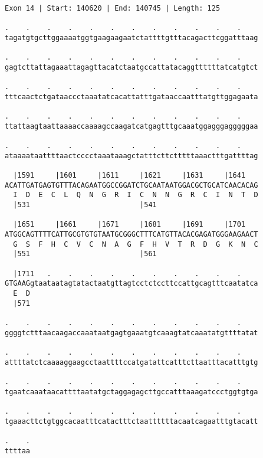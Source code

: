\documentclass{article}
\begin{document}
\begin{Verbatim}
Exon 14 | Start: 140620 | End: 140745 | Length: 125
 
.    .    .    .    .    .    .    .    .    .    .    .    
tagatgtgcttggaaaatggtgaagaagaatctattttgtttacagacttcggatttaag
  
.    .    .    .    .    .    .    .    .    .    .    .    
gagtcttattagaaattagagttacatctaatgccattatacaggttttttatcatgtct
  
.    .    .    .    .    .    .    .    .    .    .    .    
tttcaactctgataaccctaaatatcacattatttgataaccaatttatgttggagaata
  
.    .    .    .    .    .    .    .    .    .    .    .    
ttattaagtaattaaaaccaaaagccaagatcatgagtttgcaaatggagggagggggaa
  
.    .    .    .    .    .    .    .    .    .    .    .    
ataaaataattttaactcccctaaataaagctatttcttctttttaaactttgattttag
  
  |1591     |1601     |1611     |1621     |1631     |1641   
ACATTGATGAGTGTTTACAGAATGGCCGGATCTGCAATAATGGACGCTGCATCAACACAG
  I  D  E  C  L  Q  N  G  R  I  C  N  N  G  R  C  I  N  T  D
  |531                          |541                        
  
  |1651     |1661     |1671     |1681     |1691     |1701   
ATGGCAGTTTTCATTGCGTGTGTAATGCGGGCTTTCATGTTACACGAGATGGGAAGAACT
  G  S  F  H  C  V  C  N  A  G  F  H  V  T  R  D  G  K  N  C
  |551                          |561                        
  
  |1711   .    .    .    .    .    .    .    .    .    .    
GTGAAGgtaataatagtatactaatgttagtcctctccttccattgcagtttcaatatca
  E  D                                                      
  |571                                                      
  
.    .    .    .    .    .    .    .    .    .    .    .    
ggggtctttaacaagaccaaataatgagtgaaatgtcaaagtatcaaatatgttttatat
  
.    .    .    .    .    .    .    .    .    .    .    .    
attttatctcaaaaggaagcctaattttccatgatattcatttcttaatttacatttgtg
  
.    .    .    .    .    .    .    .    .    .    .    .    
tgaatcaaataacattttaatatgctaggagagcttgccatttaaagatccctggtgtga
  
.    .    .    .    .    .    .    .    .    .    .    .    
tgaaacttctgtggcacaatttcatactttctaattttttacaatcagaatttgtacatt
  
.    .
ttttaa
\end{Verbatim}
\newpage
\end{document}

